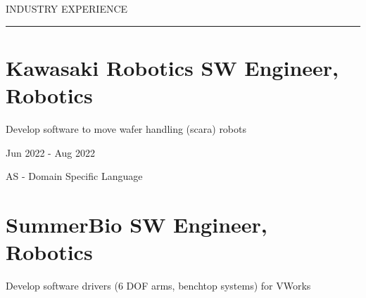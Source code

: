 
\vspace{1ex}
{\noindent\color{cblue} INDUSTRY EXPERIENCE }

\vspace{-6.5ex}
{\hspace{-1.73in}\noindent\color{dblue}\rule{6.935in}{0.4pt}} %
\vspace{-3.4ex}


\section
{\textbf{Kawasaki Robotics} \newline
SW Engineer, Robotics}{}

\vspace{-2.5ex}
\begin{detail}
    \BulletItem
    Develop software to move wafer handling (scara) robots 
\end{detail}

\begin{subtitle}
    \vspace{-5.2ex}
    {{Jun 2022 - Aug 2022}}
\end{subtitle}

{\vspace{-2ex} \color{cyan}\small {AS - Domain Specific Language}}
\vspace{1ex}


\section
{\textbf{SummerBio} \newline
SW Engineer, Robotics}{}

\vspace{-2.5ex}
\begin{detail}
    \BulletItem
    Develop software drivers (6 DOF arms, benchtop systems) for VWorks
\end{detail}


